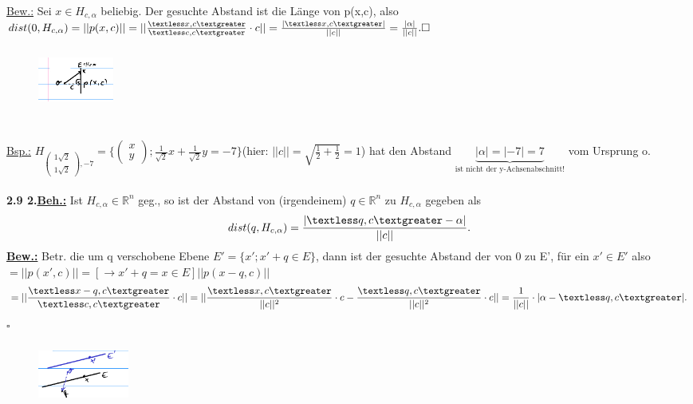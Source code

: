 \documentclass[]{scrartcl}
\begin{document}
 \underline{Bew.:} Sei $x\in H_{c,\alpha}$ beliebig.
 Der gesuchte Abstand ist die Länge von p(x,c), also $dist(0, 
 H_{c,\alpha})=||p(x,c)||=||\frac{\textless x,c\textgreater}{\textless 
 c,c\textgreater}\cdot c||=\frac{|\textless 
 x,c\textgreater|}{||c||}=\frac{|\alpha|}{||c||}. \square$
 \begin{figure}[h]
 	\includegraphics[width=2.5cm,height=2cm]{Beispiel 2.8}
 \end{figure}\\
\underline{Bsp.:} 
$H_{\begin{pmatrix}
	1\sqrt{2}\\
	1\sqrt{2}
\end{pmatrix},-7}=\{\begin{pmatrix}
	x\\y
\end{pmatrix}; \frac{1}{\sqrt{2}}x+\frac{1}{\sqrt{2}}y=-7\}$(hier: 
$||c||=\sqrt{\frac{1}{2}+\frac{1}{2}}=1$) hat den Abstand $\underbrace{|\alpha| = |-7|=7}_{\text{ist nicht der y-Achsenabschnitt!}}$ 
vom Ursprung o.\\
\\
\textbf{2.9 2.\underline{Beh.:}} Ist $H_{c,\alpha}\in \mathbb{R}^n$ geg., so ist 
der 
Abstand von (irgendeinem) $ q \in \mathbb{R}^n$ zu $H_{c,\alpha}$ gegeben als\\
\begin{equation}
	dist(q,H_{c,\alpha})= \frac{|\textless q,c\textgreater-\alpha |}{||c||}.
\end{equation}
\textbf{\underline{Bew.:}} Betr. die um q verschobene Ebene $E'= \{x'; x'+q\in 
E\}$, dann ist der gesuchte Abstand der von 0 zu E', für ein $x'\in E'$ also 
$=||p(x',c)|| = [\rightarrow x'+q=x\in E] ||p(x-q,c)||$\\
\begin{equation}
	=||\frac{\textless x-q,c\textgreater}{\textless c,c \textgreater}\cdot c||=
	||\frac{\textless x,c \textgreater}{||c||^2}\cdot c -\frac{\textless q,c 
	\textgreater}{||c||^2}\cdot c||=
	\frac{1}{||c||}\cdot|\alpha - \textless q,c \textgreater|.
\end{equation}
\hfill$\square$\\
\begin{figure}[h]  
	\includegraphics[width=3cm,height=2cm]{bild 2.9}
\end{figure}\\
\end{document}

